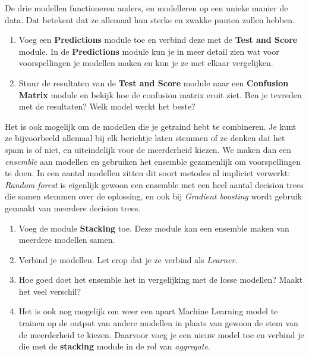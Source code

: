 \documentclass{article}
\newcommand{\tb}[1]{\textbf{#1}}
\begin{document}
De drie modellen functioneren anders, en modelleren op een unieke manier de data. Dat betekent dat ze allemaal hun sterke en zwakke punten zullen hebben.

\begin{enumerate}[resume]
\item Voeg een \tb{Predictions} module toe en verbind deze met de \tb{Test and Score} module. In de \tb{Predictions} module kun je in meer detail zien wat voor voorspellingen je modellen maken en kun je ze met elkaar vergelijken.
\item Stuur de resultaten van de \tb{Test and Score} module naar een \tb{Confusion Matrix} module en bekijk hoe de confusion matrix eruit ziet. Ben je tevreden met de resultaten? Welk model werkt het beste?
\end{enumerate}

Het is ook mogelijk om de modellen die je getraind hebt te combineren. Je kunt ze bijvoorbeeld allemaal bij elk berichtje laten stemmen of ze denken dat het spam is of niet, en uiteindelijk voor de meerderheid kiezen. We maken dan een \textit{ensemble} aan modellen en gebruiken het ensemble gezamenlijk om voorspellingen te doen. In een aantal modellen zitten dit soort metodes al impliciet verwerkt: \textit{Random forest} is eigenlijk gewoon een ensemble met een heel aantal decision trees die samen stemmen over de oplossing, en ook bij \textit{Gradient boosting} wordt gebruik gemaakt van meerdere decision trees.

\begin{enumerate}[resume]
\item Voeg de module \tb{Stacking} toe. Deze module kan een ensemble maken van meerdere modellen samen.
\item Verbind je modellen. Let erop dat je ze verbind als \textit{Learner}.
\item Hoe goed doet het ensemble het in vergelijking met de losse modellen? Maakt het veel verschil?
\item Het is ook nog mogelijk om weer een apart Machine Learning model te trainen op de output van andere modellen in plaats van gewoon de stem van de meerderheid te kiezen. Daarvoor voeg je een nieuw model toe en verbind je die met de \tb{stacking} module in de rol van \textit{aggregate}.
\end{enumerate}
\end{document}
